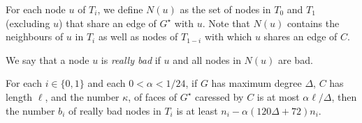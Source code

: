 \documentclass{patmorin}
\newcommand{\dual}[1]{{#1}^\star}
\begin{document}
For each node $u$ of $T_i$, we define $N(u)$ as the set of nodes in $T_0$
and $T_1$ (excluding $u$) that share an edge of $\dual{G}$ with $u$.
Note that $N(u)$ contains the neighbours of $u$ in $T_i$ as well as
nodes of $T_{1-i}$ with which $u$ shares an edge of $C$.


%



We say that a node $u$ is \emph{really bad} if $u$ and all nodes in $N(u)$ are bad.

\begin{lem}
  For each $i\in\{0,1\}$ and each $0<\alpha < 1/24$,
  if $G$ has maximum degree $\Delta$, $C$ has length $\ell$, and the number
  $\kappa$, of faces of $\dual{G}$ caressed by $C$ is at most $\alpha\ell/\Delta$, then the number $b_i$ of really bad nodes in $T_i$ is at least $n_i - \alpha(120\Delta+72) n_i$.
\end{lem}
\end{document}
